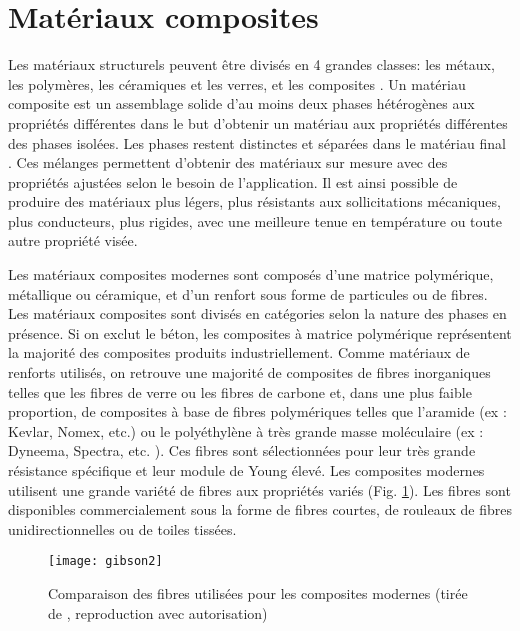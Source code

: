 \label{sec:RevLitt}

\section{Matériaux composites}

Les matériaux structurels peuvent être divisés en 4 grandes classes: les métaux, les polymères, les céramiques et les verres, et les composites \cite{ashby2018materials}. 
Un matériau composite est un assemblage solide d'au moins deux phases hétérogènes aux propriétés différentes dans le but d'obtenir un matériau aux propriétés différentes des phases isolées. 
Les phases restent distinctes et séparées dans le matériau final \cite{Wikipedia_mat_comp}. 
Ces mélanges permettent d'obtenir des matériaux sur mesure avec des propriétés ajustées selon le besoin de l'application. 
Il est ainsi possible de produire des matériaux plus légers, plus résistants aux sollicitations mécaniques, plus conducteurs, plus rigides, avec une meilleure tenue en température ou toute autre propriété visée. 

Les matériaux composites modernes sont composés d'une matrice polymérique, métallique ou céramique, et d'un renfort sous forme de particules ou de fibres. 
Les matériaux composites sont divisés en catégories selon la nature des phases en présence. 
Si on exclut le béton, les composites à matrice polymérique représentent la majorité des composites produits industriellement. 
Comme matériaux de renforts utilisés, on retrouve une majorité de composites de fibres inorganiques telles que les fibres de verre ou les fibres de carbone et, dans une plus faible proportion, de composites à base de fibres polymériques telles que l'aramide (ex : Kevlar, Nomex, etc.) ou le polyéthylène à très grande masse moléculaire (ex : Dyneema, Spectra, etc. ). 
Ces fibres sont sélectionnées pour leur très grande résistance spécifique et leur module de Young élevé. 
Les composites modernes utilisent une grande variété de fibres aux propriétés variés (Fig. \ref{gibson2}). 
Les fibres sont disponibles commercialement sous la forme de fibres courtes, de rouleaux de fibres unidirectionnelles ou de toiles tissées. 

\begin{figure}
	\centering
	\texttt{[image: gibson2]}
	\caption{Comparaison des fibres utilisées pour les composites modernes (tirée de \cite{Gibson2011}, reproduction avec autorisation)}
	\label{gibson2}
\end{figure}

